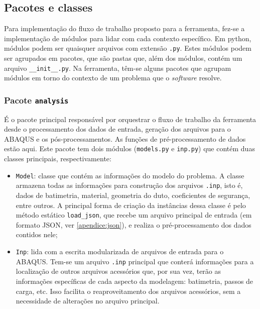 \subsection{Pacotes e classes}


Para implementação do fluxo de trabalho proposto para a ferramenta, fez-se a implementação de módulos para lidar com cada contexto específico.
Em python, módulos podem ser quaisquer arquivos com extensão \texttt{.py}.
Estes módulos podem ser agrupados em pacotes, que são pastas que, além dos módulos, contém um arquivo \texttt{\_\_init\_\_.py}.  %
Na ferramenta, têm-se alguns pacotes que agrupam módulos em torno do contexto de um problema que o \textit{software} resolve.


\subsubsection{Pacote \texttt{analysis}}


É o pacote principal responsável por orquestrar o fluxo de trabalho da ferramenta desde o processamento dos dados de entrada, geração dos arquivos para o ABAQUS e os pós-processamentos.
As funções de pré-processamento de dados estão aqui.
Este pacote tem dois módulos (\texttt{models.py} e \texttt{inp.py}) que contém duas classes principais, respectivamente:

\begin{itemize}
    \item \texttt{Model}: classe que contém as informações do modelo do problema.
    A classe armazena todas as informações para construção dos arquivos \texttt{.inp}, isto é, dados de batimetria, material, geometria do duto, coeficientes de segurança, entre outros.
    A principal forma de criação da instâncias dessa classe é pelo método estático \texttt{load\_json}, que recebe um arquivo principal de entrada (em formato JSON, ver \autoref{apendice:json}), e realiza o pré-processamento dos dados contidos nele;

    \item \texttt{Inp}: lida com a escrita modularizada de arquivos de entrada  para o ABAQUS. Tem-se um arquivo \texttt{.inp} principal que conterá informações para a localização de outros arquivos acessórios que, por sua vez, terão as informações específicas de cada aspecto da modelagem: batimetria, passos de carga, etc. Isso facilita o reaproveitamento dos arquivos acessórios, sem a necessidade de alterações no arquivo principal.
\end{itemize}

